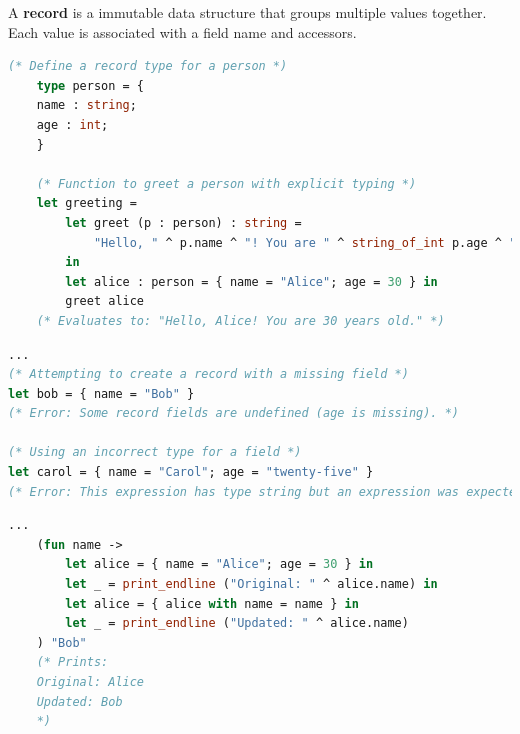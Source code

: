 \begin{Def}

A \textbf{record} is a immutable data structure that groups multiple values together. Each value is associated with a field name and accessors.

    \begin{lstlisting}[language=OCaml, caption={Defining and Using Records}, numbers=none]
    (* Define a record type for a person *)
    type person = {
    name : string;
    age : int;
    }

    (* Function to greet a person with explicit typing *)
    let greeting =
        let greet (p : person) : string =
            "Hello, " ^ p.name ^ "! You are " ^ string_of_int p.age ^ " years old."
        in
        let alice : person = { name = "Alice"; age = 30 } in
        greet alice
    (* Evaluates to: "Hello, Alice! You are 30 years old." *)
    \end{lstlisting}

\begin{lstlisting}[language=OCaml, caption={Incorrect Usage Example}, numbers=none]
...
(* Attempting to create a record with a missing field *)
let bob = { name = "Bob" }
(* Error: Some record fields are undefined (age is missing). *)

(* Using an incorrect type for a field *)
let carol = { name = "Carol"; age = "twenty-five" }
(* Error: This expression has type string but an expression was expected of type int. *)
\end{lstlisting}

    \begin{lstlisting}[language=OCaml, caption={Updating Records}, numbers=none]
    ...
    (fun name ->
        let alice = { name = "Alice"; age = 30 } in
        let _ = print_endline ("Original: " ^ alice.name) in
        let alice = { alice with name = name } in
        let _ = print_endline ("Updated: " ^ alice.name)
    ) "Bob"
    (* Prints:
    Original: Alice
    Updated: Bob
    *)
\end{lstlisting}
\end{Def}

\newpage 


